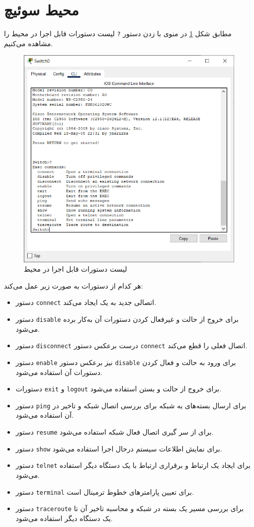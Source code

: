 \documentclass{article}
\newcommand{\code}[1]{\colorbox{codegray}{\texttt{#1}}}
\begin{document}
\section{محیط  سوئیچ}

مطابق شکل \ref{fig:user-excec-commands} در منوی  با زدن دستور \code{?} لیست دستورات قابل اجرا در محیط  را مشاهده می‌کنیم.
\begin{figure}[h!]
	\centering
	\includegraphics[width=0.6\columnwidth]{figs/user-excec-commands.jpg}
	\caption{لیست دستورات قابل اجرا در محیط }
	\label{fig:user-excec-commands}
\end{figure}

هر کدام از دستورات به صورت زیر عمل می‌کند:
\begin{itemize}
	\item 
	دستور \code{connect} اتصالی جدید به یک  ایجاد می‌کند.
	\item 
	دستور \code{disable} برای خروج از حالت  و غیرفعال کردن دستورات آن به‌کار برده می‌شود.
	\item 
	دستور \code{disconnect} درست برعکس دستور \code{connect} اتصال فعلی را قطع می‌کند.
	\item 
	دستور \code{enable} نیز برعکس دستور \code{disable} برای ورود به حالت  و فعال کردن دستورات آن استفاده می‌شود.
	\item 
	دستورات \code{exit}  و \code{logout} برای خروج از حالت  و بستن  استفاده می‌شود.
	\item 
	دستور \code{ping} برای ارسال بسته‌های  به شبکه برای بررسی اتصال شبکه و تاخیر در آن استفاده می‌شود.
	\item 
	دستور \code{resume} برای از سر گیری اتصال فعال شبکه استفاده می‌شود.
	\item 
	دستور \code{show} برای نمایش اطلاعات سیستم درحال اجرا استفاده می‌شود.
	\item 
	دستور \code{telnet} برای ایجاد یک ارتباط  و برقراری ارتباط با یک دستگاه دیگر استفاده می‌شود.
	\item 
	دستور \code{terminal} برای تعیین پارامترهای خطوط ترمینال است.
	\item 
	دستور \code{traceroute} برای بررسی مسیر یک بسته در شبکه و محاسبه تاخیر آن تا یک دستگاه دیگر استفاده می‌شود.
\end{itemize}
\end{document}
